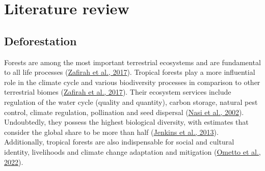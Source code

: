 \documentclass[
  letterpaper,
  DIV=11,
  numbers=noendperiod]{scrreprt}
\begin{document}

\hypertarget{literature-review}{%
\chapter{Literature review}\label{literature-review}}

\hypertarget{sec-deforestation}{%
\section{Deforestation}\label{sec-deforestation}}

Forests are among the most important terrestrial ecosystems and are
fundamental to all life processes
(\protect\hyperlink{ref-zafirahSustainableEcosystemServices2017}{Zafirah
et al., 2017}). Tropical forests play a more influential role in the
climate cycle and various biodiversity processes in comparison to other
terrestrial biomes
(\protect\hyperlink{ref-zafirahSustainableEcosystemServices2017}{Zafirah
et al., 2017}). Their ecosystem services include regulation of the water
cycle (quality and quantity), carbon storage, natural pest control,
climate regulation, pollination and seed dispersal
(\protect\hyperlink{ref-nasiForestEcosystemServices2002}{Nasi et al.,
2002}). Undoubtedly, they possess the highest biological diversity, with
estimates that consider the global share to be more than half
(\protect\hyperlink{ref-jenkinsGlobalPatternsTerrestrial2013}{Jenkins et
al., 2013}). Additionally, tropical forests are also indispensable for
social and cultural identity, livelihoods and climate change adaptation
and mitigation
(\protect\hyperlink{ref-omettoContributionWorkingGroup2022}{Ometto et
al., 2022}).
\end{document}
